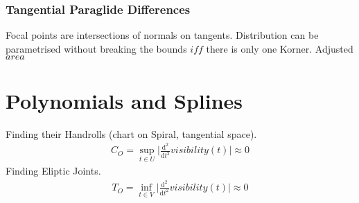 \documentclass{report}
\begin{document}
\subsection{Tangential Paraglide Differences}
Focal points are intersections of normals on tangents. Distribution can be parametrised without breaking the bounds $iff$ there is only one Korner. Adjusted $area$

\chapter{Polynomials and Splines}
Finding their Handrolls (chart on Spiral, tangential space).
\begin{align}
C_{O}=\sup_{t \in U} \lvert \frac{\mathrm{d}^2}{\mathrm{d}t^2}visibility(t) \rvert \approx 0
\end{align}
Finding Eliptic Joints.\\
\begin{align}
T_{O}=\inf_{t \in V} \lvert \frac{\mathrm{d}^2}{\mathrm{d}t^2}visibility(t) \rvert \approx 0
\end{align}

\iffalse
\printbibliography
\fi
{}

\end{document}
